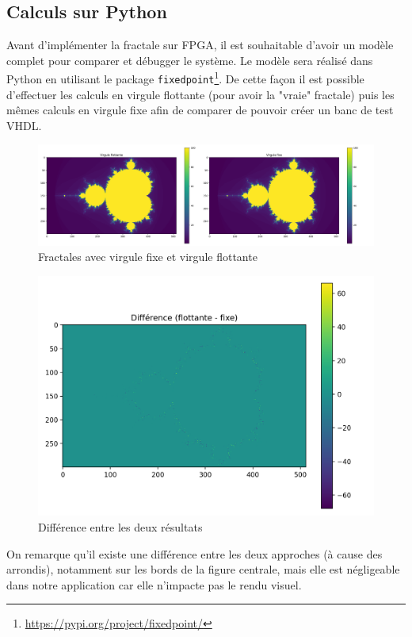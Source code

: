 \documentclass[LPSC_Labo03_SDeriaz]{subfiles}
\begin{document}
\subsection{Calculs sur Python}
Avant d'implémenter la fractale sur FPGA, il est souhaitable d'avoir un modèle complet pour comparer et débugger le système. Le modèle sera réalisé dans Python en utilisant le package \verb!fixedpoint!\footnote{\url{https://pypi.org/project/fixedpoint/}}. De cette façon il est possible d'effectuer les calculs en virgule flottante (pour avoir la "vraie" fractale) puis les mêmes calculs en virgule fixe afin de comparer de pouvoir créer un banc de test VHDL.
\begin{figure}[H]
\centering
\includegraphics[width=\textwidth]{mandelbrot_comparaison.png}
\caption{Fractales avec virgule fixe et virgule flottante}
\end{figure}
\begin{figure}[H]
\centering
\includegraphics[scale=0.4]{mandelbrot_difference.png}
\caption{Différence entre les deux résultats}
\end{figure}
On remarque qu'il existe une différence entre les deux approches (à cause des arrondis), notamment sur les bords de la figure centrale, mais elle est négligeable dans notre application car elle n'impacte pas le rendu visuel.
\end{document}
